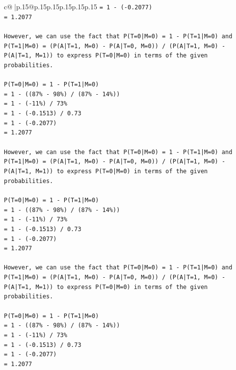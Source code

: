 \documentclass{article}
\begin{document}
{\begin{supertabular}{c@{$\;$}|p{.15\linewidth}@{}p{.15\linewidth}p{.15\linewidth}p{.15\linewidth}p{.15\linewidth}p{.15\linewidth}}
{{{\texttt{= 1 {-} ({-}0.2077)} \\
\texttt{= 1.2077} \\
\\ 
\texttt{However, we can use the fact that P(T=0|M=0) = 1 {-} P(T=1|M=0) and P(T=1|M=0) = (P(A|T=1, M=0) {-} P(A|T=0, M=0)) / (P(A|T=1, M=0) {-} P(A|T=1, M=1)) to express P(T=0|M=0) in terms of the given probabilities.} \\
\\ 
\texttt{P(T=0|M=0) = 1 {-} P(T=1|M=0)} \\
\texttt{= 1 {-} ((87\% {-} 98\%) / (87\% {-} 14\%))} \\
\texttt{= 1 {-} ({-}11\%) / 73\%} \\
\texttt{= 1 {-} ({-}0.1513) / 0.73} \\
\texttt{= 1 {-} ({-}0.2077)} \\
\texttt{= 1.2077} \\
\\ 
\texttt{However, we can use the fact that P(T=0|M=0) = 1 {-} P(T=1|M=0) and P(T=1|M=0) = (P(A|T=1, M=0) {-} P(A|T=0, M=0)) / (P(A|T=1, M=0) {-} P(A|T=1, M=1)) to express P(T=0|M=0) in terms of the given probabilities.} \\
\\ 
\texttt{P(T=0|M=0) = 1 {-} P(T=1|M=0)} \\
\texttt{= 1 {-} ((87\% {-} 98\%) / (87\% {-} 14\%))} \\
\texttt{= 1 {-} ({-}11\%) / 73\%} \\
\texttt{= 1 {-} ({-}0.1513) / 0.73} \\
\texttt{= 1 {-} ({-}0.2077)} \\
\texttt{= 1.2077} \\
\\ 
\texttt{However, we can use the fact that P(T=0|M=0) = 1 {-} P(T=1|M=0) and P(T=1|M=0) = (P(A|T=1, M=0) {-} P(A|T=0, M=0)) / (P(A|T=1, M=0) {-} P(A|T=1, M=1)) to express P(T=0|M=0) in terms of the given probabilities.} \\
\\ 
\texttt{P(T=0|M=0) = 1 {-} P(T=1|M=0)} \\
\texttt{= 1 {-} ((87\% {-} 98\%) / (87\% {-} 14\%))} \\
\texttt{= 1 {-} ({-}11\%) / 73\%} \\
\texttt{= 1 {-} ({-}0.1513) / 0.73} \\
\texttt{= 1 {-} ({-}0.2077)} \\
\texttt{= 1.2077} \\
\\ 
}}}
\end{supertabular}}
\end{document}
